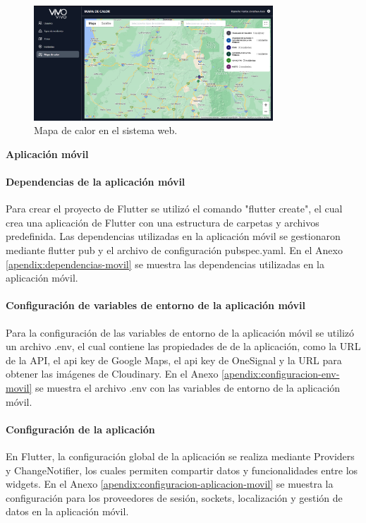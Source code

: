 \begin{figure}[H]
    \centering
    \includegraphics[width=0.8\textwidth]{chapters/III-resultados-y-discusion/resources/images/mapa-de-calor-web.png}
    \caption{Mapa de calor en el sistema web.}
    \label{fig:mapa-de-calor-web}
\end{figure}

\textbf{Aplicación móvil}
\bigbreak

\paragraph{Dependencias de la aplicación móvil}
Para crear el proyecto de Flutter se utilizó el comando "flutter create", el cual crea una aplicación de Flutter con
una estructura de carpetas y archivos predefinida. Las dependencias utilizadas en la aplicación móvil se gestionaron mediante flutter pub
y el archivo de configuración pubspec.yaml. En el Anexo \ref{apendix:dependencias-movil} se muestra las dependencias utilizadas en la
aplicación móvil.

\paragraph{Configuración de variables de entorno de la aplicación móvil}
Para la configuración de las variables de entorno de la aplicación móvil se utilizó un archivo .env, el cual contiene las propiedades de
de la aplicación, como la URL de la API, el api key de Google Maps, el api key de OneSignal y la URL para obtener las imágenes
de Cloudinary. En el Anexo \ref{apendix:configuracion-env-movil} se muestra el archivo .env con las variables de entorno de la aplicación móvil.

\paragraph{Configuración de la aplicación}
En Flutter, la configuración global de la aplicación se realiza mediante Providers y ChangeNotifier, los cuales permiten compartir datos y
funcionalidades entre los widgets. En el Anexo \ref{apendix:configuracion-aplicacion-movil} se muestra la configuración para los
proveedores de sesión, sockets, localización y gestión de datos en la aplicación móvil.

